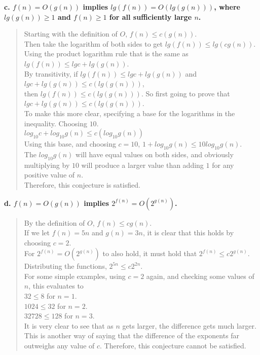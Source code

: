 \documentclass{article}
\begin{document}
\textbf{c. $f(n) = O(g(n))$ implies $lg(f(n)) = O(lg(g(n)))$, where $lg(g(n)) \geq 1$ and $f(n) \geq 1$ for all 
sufficiently large $n$.\\}
\begin{quote}
\textsf{Starting with the definition of $O$, $f(n) \leq c(g(n))$.\\
Then take the logarithm of both sides to get $lg(f(n)) \leq lg(cg(n))$.\\
Using the product logarithm rule that is the same as $lg(f(n)) \leq lgc + lg(g(n))$.\\
By transitivity, if $lg(f(n)) \leq lgc + lg(g(n))$ and $lgc + lg(g(n)) \leq c(lg(g(n)))$,\\
then $lg(f(n)) \leq c(lg(g(n)))$. So first going to prove that $lgc + lg(g(n)) \leq c(lg(g(n)))$.\\
To make this more clear, specifying a base for the logarithms in the inequality. Choosing $10$.\\
$log_{10}c + log_{10}g(n) \leq c(log_{10}g(n))$\\
Using this base, and choosing $c = 10$, $1 + log_{10}g(n) \leq 10log_{10}g(n)$.\\
The $log_{10}g(n)$ will have equal values on both sides, and obviously multiplying by $10$ will produce
a larger value than adding $1$ for any positive value of $n$.\\
Therefore, this conjecture is satisfied.\\}
\end{quote}

\textbf{d. $f(n) = O(g(n))$ implies $2^{f(n)} = O(2^{g(n)})$.\\}
\begin{quote}
\textsf{By the definition of $O$, $f(n) \leq cg(n)$.\\
If we let $f(n) = 5n$ and $g(n) = 3n$, it is clear that this holds by choosing $c = 2$.\\
For $2^{f(n)} = O(2^{g(n)})$ to also hold, it must hold that $2^{f(n)} \leq c2^{g(n)}$.\\
Distributing the functions, $2^{5n} \leq c2^{2n}$.\\
For some simple examples, using $c = 2$ again, and checking some values of $n$, this evaluates to\\
$32 \leq 8$ for $n = 1$.\\
$1024 \leq 32$ for $n = 2$.\\
$32728 \leq 128$ for $n = 3$.\\
It is very clear to see that as $n$ gets larger, the difference gets much larger. This is another way of
saying that the difference of the exponents far outweighs any value of $c$. Therefore, this conjecture
cannot be satisfied.\\}
\end{quote}
\end{document}
